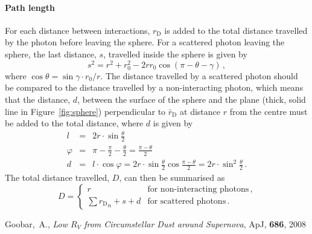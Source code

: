 \documentclass[a4paper,12pt]{article}
\newcommand{\poslen}{r_\mathrm{0}}
\newcommand{\dislen}{r_\mathrm{D}}
\newcommand{\disvec}{\bar{r}_\mathrm{D}}
\begin{document}
\paragraph{Path length} For each distance between interactions,
$\dislen$ is added to the total distance travelled by the photon
before leaving the sphere. For a scattered photon leaving the sphere,
the last distance, $s$, travelled inside the sphere is given by
\[
  s^2 = r^2 + \poslen^2 - 2r\poslen\cos\left(\pi-\theta-\gamma\right)\,,
\]
where $\cos\theta = \sin\gamma \cdot \poslen/r$. The distance
travelled by a scattered photon should be compared to the distance
travelled by a non-interacting photon, which means that the distance,
$d$, between the surface of the sphere and the plane (thick, solid
line in Figure~\ref{fig:sphere}) perpendicular to $\disvec$ at
distance $r$ from the centre must be added to the total distance,
where $d$ is given by
\begin{eqnarray*}
  l & = & 2r\cdot\sin\frac{\theta}{2}\\
  \varphi & = & \pi - \frac{\pi}{2} - \frac{\theta}{2} =
  \frac{\pi-\theta}{2}\\
  d & = & l\cdot\cos\varphi =
  2r\cdot\sin\frac{\theta}{2}\cos\frac{\pi-\theta}{2} =
  2r\cdot\sin^2\frac{\theta}{2}\, .
\end{eqnarray*}
The total distance travelled, $D$, can then be summarised as
\[
D = \left\{%
  \begin{array}{ll}
    r & \textrm{for non-interacting photons}\,,\\
    \sum {\dislen}_n + s + d & \textrm{for scattered photons}\,.
  \end{array}\right.
\]

\begin{thebibliography}{99}
    Goobar,~A., \emph{Low $R_{V}$ from Circumstellar Dust around
      Supernova}, ApJ, \textbf{686}, 2008
\end{thebibliography}
\end{document}
